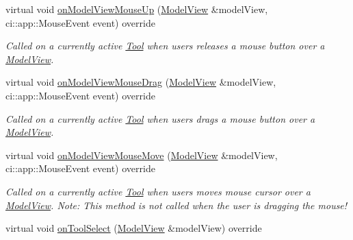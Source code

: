 \begin{DoxyCompactItemize}
\mbox{\label{classpepr3d_1_1_brush_acf9efe6c3b3b8bed2ed8b06c68f5f0f9}} 
virtual void \mbox{\hyperlink{classpepr3d_1_1_brush_acf9efe6c3b3b8bed2ed8b06c68f5f0f9}{on\+Model\+View\+Mouse\+Up}} (\mbox{\hyperlink{classpepr3d_1_1_model_view}{Model\+View}} \&model\+View, ci\+::app\+::\+Mouse\+Event event) override
\begin{DoxyCompactList}\small\item\em Called on a currently active \mbox{\hyperlink{classpepr3d_1_1_tool}{Tool}} when users releases a mouse button over a \mbox{\hyperlink{classpepr3d_1_1_model_view}{Model\+View}}. \end{DoxyCompactList}\item 
\mbox{\label{classpepr3d_1_1_brush_abfe0a46814dcd751d3801a8dfacd07cb}} 
virtual void \mbox{\hyperlink{classpepr3d_1_1_brush_abfe0a46814dcd751d3801a8dfacd07cb}{on\+Model\+View\+Mouse\+Drag}} (\mbox{\hyperlink{classpepr3d_1_1_model_view}{Model\+View}} \&model\+View, ci\+::app\+::\+Mouse\+Event event) override
\begin{DoxyCompactList}\small\item\em Called on a currently active \mbox{\hyperlink{classpepr3d_1_1_tool}{Tool}} when users drags a mouse button over a \mbox{\hyperlink{classpepr3d_1_1_model_view}{Model\+View}}. \end{DoxyCompactList}\item 
\mbox{\label{classpepr3d_1_1_brush_a5708ed96781b524410ac440ead73507f}} 
virtual void \mbox{\hyperlink{classpepr3d_1_1_brush_a5708ed96781b524410ac440ead73507f}{on\+Model\+View\+Mouse\+Move}} (\mbox{\hyperlink{classpepr3d_1_1_model_view}{Model\+View}} \&model\+View, ci\+::app\+::\+Mouse\+Event event) override
\begin{DoxyCompactList}\small\item\em Called on a currently active \mbox{\hyperlink{classpepr3d_1_1_tool}{Tool}} when users moves mouse cursor over a \mbox{\hyperlink{classpepr3d_1_1_model_view}{Model\+View}}. Note\+: This method is not called when the user is dragging the mouse! \end{DoxyCompactList}\item 
\mbox{\label{classpepr3d_1_1_brush_ae73bad242cb367db774983ba3bd9022f}} 
virtual void \mbox{\hyperlink{classpepr3d_1_1_brush_ae73bad242cb367db774983ba3bd9022f}{on\+Tool\+Select}} (\mbox{\hyperlink{classpepr3d_1_1_model_view}{Model\+View}} \&model\+View) override

\end{DoxyCompactItemize}
